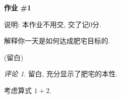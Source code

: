 \documentclass{exam}
\theoremstyle{remark}
\newtheorem*{remark}{评论}
\newenvironment{hint}{%
	\ifvmode
		\ignorespaces
	\else
		\quad
	\fi
	\begin{tikzpicture}[baseline=(H.base), every node/.style={signal, draw, very thin, signal to=east, signal from=nowhere, signal pointer angle=120, inner sep=2pt}]
		\node[anchor=mid west] (H) at (0,0) {\heiti\footnotesize 提示};
	\end{tikzpicture}
}{}
\begin{document}
    \vspace*{0in}
    \begin{center}
        \Huge\bf 作业 \#1 %
    \end{center}
	
	\unframedsolutions %
	\SolutionEmphasis{\fangsong} %
    \printanswers %
    
    {\small\kaishu 说明: 本作业不用交, 交了记0分.}

    \begin{questions}
        \question[5] 解释你一天是如何达成肥宅目标的.
        \begin{solution}
            (留白)
        \end{solution}
        \begin{remark}
            留白, 充分显示了肥宅的本性.
        \end{remark}

        \question[5] 考虑算式 $1 + 2$.
        \begin{solution}
        \end{solution}
    \end{questions}
\end{document}
